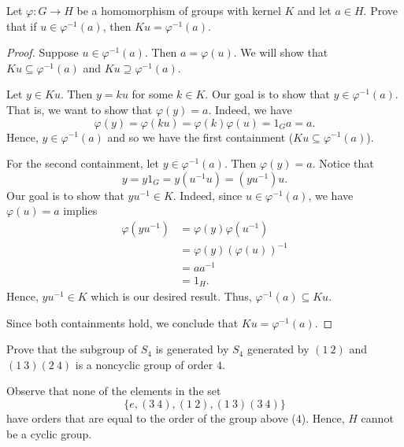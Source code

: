 \documentclass[a4paper]{article}
\begin{document}
\begin{problem}
    Let \( \varphi : G \to H  \) be a homomorphism of groups with kernel \( K  \) and let \( a \in H  \). Prove that if \( u \in \varphi^{-1}(a) \), then \( Ku = \varphi^{-1}(a) \).
\end{problem}
\begin{proof}
Suppose \( u \in \varphi^{-1}(a) \). Then \( a = \varphi(u) \). We will show that \( Ku \subseteq \varphi^{-1}(a) \) and \( Ku \supseteq \varphi^{-1}(a) \). 

Let \( y \in Ku \). Then \( y = k u  \) for some \( k \in K  \). Our goal is to show that \( y \in \varphi^{-1}(a) \). That is, we want to show that \( \varphi(y) = a  \). Indeed, we have 
\[  \varphi(y) = \varphi(ku)  = \varphi(k) \varphi(u) = {1}_{G} a = a. \]
Hence, \( y \in \varphi^{-1}(a) \) and so we have the first containment (\( Ku \subseteq \varphi^{-1}(a)  \)).

For the second containment, let \( y \in \varphi^{-1}(a) \). Then \( \varphi(y) = a  \). Notice that 
\[  y = y {1}_{G} = y(u^{-1} u) = (y u^{-1}) u. \]
Our goal is to show that \( y u^{-1} \in K \). Indeed, since \( u \in \varphi^{-1}(a) \), we have \( \varphi(u) = a  \) implies
\begin{align*}
    \varphi(y u^{-1}) &= \varphi(y) \varphi(u^{-1}) \\
                      &= \varphi(y) (\varphi(u))^{-1} \\
                      &= a a^{-1} \\
                      &= {1}_{H}. 
\end{align*}
Hence, \( y u^{-1} \in K  \) which is our desired result. Thus, \( \varphi^{-1}(a) \subseteq Ku \). 

Since both containments hold, we conclude that \( Ku = \varphi^{-1}(a) \).
\end{proof}

\begin{problem}
    Prove that the subgroup of \( {S}_{4} \) is generated by \( {S}_{4} \) generated by \( (1 \ 2) \) and \( (1 \ 3) (2 \ 4) \) is a noncyclic group of order \( 4  \).   
\end{problem}
\begin{solution}
Observe that none of the elements in the set
\[ \{e, (3  \ 4),  (1 \ 2) , (1 \ 3)(3 \ 4) \}  \]
have orders that are equal to the order of the group above (\( 4 \)). Hence, \( H  \) cannot be a cyclic group. 
\end{solution}
\end{document}
